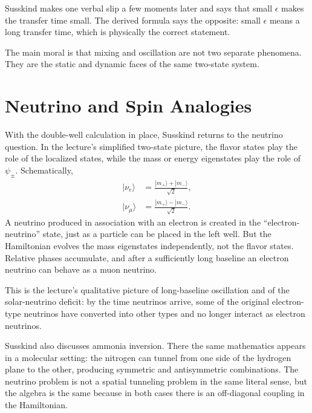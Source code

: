 Susskind makes one verbal slip a few moments later and says that small \(\epsilon\) makes the transfer time small. The derived formula says the opposite: small \(\epsilon\) means a long transfer time, which is physically the correct statement.

The main moral is that mixing and oscillation are not two separate phenomena. They are the static and dynamic faces of the same two-state system.

\section{Neutrino and Spin Analogies}

With the double-well calculation in place, Susskind returns to the neutrino question. In the lecture's simplified two-state picture, the flavor states play the role of the localized states, while the mass or energy eigenstates play the role of \(\psi_\pm\). Schematically,
\begin{align}
|\nu_e\rangle &= \frac{|m_+\rangle + |m_-\rangle}{\sqrt{2}},\\
|\nu_\mu\rangle &= \frac{|m_+\rangle - |m_-\rangle}{\sqrt{2}}.
\end{align}
A neutrino produced in association with an electron is created in the ``electron-neutrino'' state, just as a particle can be placed in the left well. But the Hamiltonian evolves the mass eigenstates independently, not the flavor states. Relative phases accumulate, and after a sufficiently long baseline an electron neutrino can behave as a muon neutrino.

This is the lecture's qualitative picture of long-baseline oscillation and of the solar-neutrino deficit: by the time neutrinos arrive, some of the original electron-type neutrinos have converted into other types and no longer interact as electron neutrinos.

Susskind also discusses ammonia inversion. There the same mathematics appears in a molecular setting: the nitrogen can tunnel from one side of the hydrogen plane to the other, producing symmetric and antisymmetric combinations. The neutrino problem is not a spatial tunneling problem in the same literal sense, but the algebra is the same because in both cases there is an off-diagonal coupling in the Hamiltonian.

